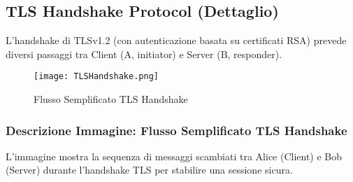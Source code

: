 \documentclass[../main.tex]{subfiles}
\begin{document}
\subsection{TLS Handshake Protocol (Dettaglio)}
L'handshake di TLSv1.2 (con autenticazione basata su certificati RSA) prevede diversi passaggi tra Client (A, initiator) e Server (B, responder).

\begin{figure}[H]
  \centering
  \texttt{[image: TLSHandshake.png]}
  \caption{Flusso Semplificato TLS Handshake}
  \label{fig:TLSHandshake}
\end{figure}

\subsubsection*{Descrizione Immagine: Flusso Semplificato TLS Handshake}
L'immagine mostra la sequenza di messaggi scambiati tra Alice (Client) e Bob (Server) durante l'handshake TLS per stabilire una sessione sicura.
\end{document}
